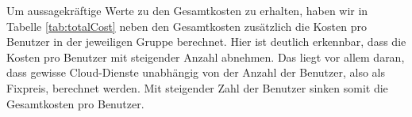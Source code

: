\documentclass{article}
\begin{document}
Um aussagekräftige Werte zu den Gesamtkosten zu erhalten, haben wir in Tabelle \ref{tab:totalCost} neben den Gesamtkosten zusätzlich die Kosten pro Benutzer in der jeweiligen Gruppe berechnet. Hier ist deutlich erkennbar, dass die Kosten pro Benutzer mit steigender Anzahl abnehmen. Das liegt vor allem daran, dass gewisse Cloud-Dienste unabhängig von der Anzahl der Benutzer, also als Fixpreis, berechnet werden. Mit steigender Zahl der Benutzer sinken somit die Gesamtkosten pro Benutzer.

\newpage

\appendix


\newpage

{}

\end{document}
